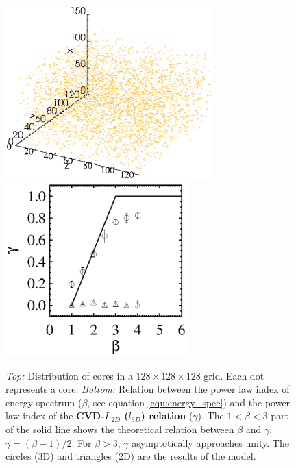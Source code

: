 \documentclass[iop,revtex4]{emulateapj}
\begin{document}
\setlength{\floatsep}{10pt plus 3pt minus 2pt}
\begin{figure}[htbp]
\includegraphics[width=8cm]{fft_simu_plot_core128.eps} \includegraphics[width=7cm]{beta_gamma128.eps}
\caption{ {\it Top:} Distribution of cores in a $128\times 128\times 128$ grid. Each dot represents a core. {\it Bottom:} Relation between the power law index of energy spectrum ($\beta$, see equation \ref{equ:energy_spec}) and the power law index of the {\bf CVD-$L_{2D}$ ($l_{3D}$) relation} ($\gamma$). The $1< \beta <3$ part of the solid line shows the theoretical relation between $\beta$ and $\gamma$, $\gamma=(\beta-1)/2$. For $\beta>3$, $\gamma$ asymptotically approaches unity. The circles (3D) and triangles (2D) are the results of the model.
\label{core128}}
\end{figure}
\end{document}
